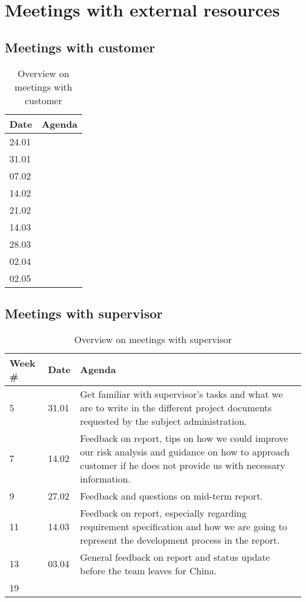 \chapter{Meetings with external resources}
\section{Meetings with customer}
\begin{table}[H]
\centering
\begin{tabular}{|l|l|}
\hline
\textbf{Date}&\textbf{Agenda}\\\hline
24.01&\\\hline
31.01&\\\hline
07.02&\\\hline
14.02&\\\hline
21.02&\\\hline
14.03&\\\hline
28.03&\\\hline
02.04&\\\hline
02.05&\\\hline
\end{tabular}
\caption{Overview on meetings with customer}
\end{table}

\section{Meetings with supervisor}
\begin{table}[H]
\centering
\begin{tabular}{|l|l|p{12.6cm}|}
\hline
\textbf{Week \#} & \textbf{Date}&\textbf{Agenda}\\\hline
5& 31.01&Get familiar with supervisor's tasks and what we are to write in the different project documents requested by the subject administration.\\\hline
7 &14.02&Feedback on report, tips on how we could improve our risk analysis and guidance on how to approach customer if he does not provide us with necessary information.\\\hline
9 &27.02& Feedback and questions on mid-term report.\\\hline
11 &14.03& Feedback on report, especially regarding requirement specification and how we are going to represent the development process in the report.\\\hline
13 &03.04&General feedback on report and status update before the team leaves for China.\\\hline
19&&\\\hline
\end{tabular}
\caption{Overview on meetings with supervisor}
\end{table}

